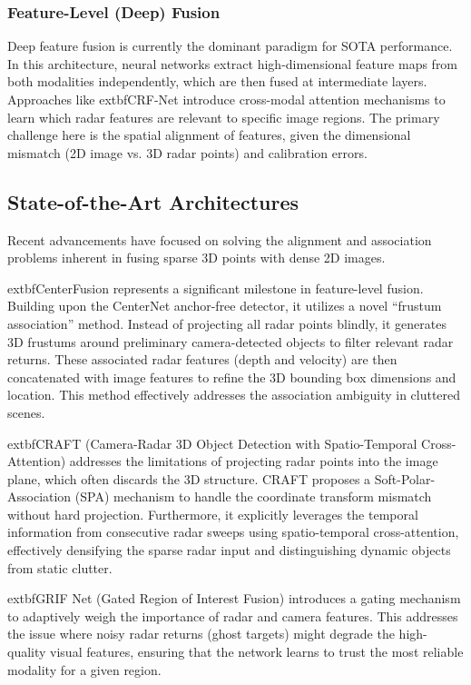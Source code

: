 \subsubsection{Feature-Level (Deep) Fusion}
Deep feature fusion is currently the dominant paradigm for SOTA performance. In this architecture, neural networks extract high-dimensional feature maps from both modalities independently, which are then fused at intermediate layers. Approaches like 	extbf{CRF-Net} \cite{Nobis2019} introduce cross-modal attention mechanisms to learn which radar features are relevant to specific image regions. The primary challenge here is the spatial alignment of features, given the dimensional mismatch (2D image vs. 3D radar points) and calibration errors.

\subsection{State-of-the-Art Architectures}

Recent advancements have focused on solving the alignment and association problems inherent in fusing sparse 3D points with dense 2D images.

	extbf{CenterFusion} \cite{Nabati2021} represents a significant milestone in feature-level fusion. Building upon the CenterNet anchor-free detector, it utilizes a novel ``frustum association'' method. Instead of projecting all radar points blindly, it generates 3D frustums around preliminary camera-detected objects to filter relevant radar returns. These associated radar features (depth and velocity) are then concatenated with image features to refine the 3D bounding box dimensions and location. This method effectively addresses the association ambiguity in cluttered scenes.

	extbf{CRAFT} (Camera-Radar 3D Object Detection with Spatio-Temporal Cross-Attention) \cite{Kim2023} addresses the limitations of projecting radar points into the image plane, which often discards the 3D structure. CRAFT proposes a Soft-Polar-Association (SPA) mechanism to handle the coordinate transform mismatch without hard projection. Furthermore, it explicitly leverages the temporal information from consecutive radar sweeps using spatio-temporal cross-attention, effectively densifying the sparse radar input and distinguishing dynamic objects from static clutter.

	extbf{GRIF Net} (Gated Region of Interest Fusion) \cite{Kim2020} introduces a gating mechanism to adaptively weigh the importance of radar and camera features. This addresses the issue where noisy radar returns (ghost targets) might degrade the high-quality visual features, ensuring that the network learns to trust the most reliable modality for a given region.

